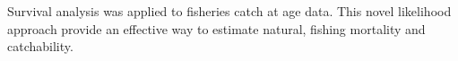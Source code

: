 Survival analysis was applied to fisheries catch at age data. This novel likelihood approach provide an effective way to estimate natural, fishing mortality and catchability.

